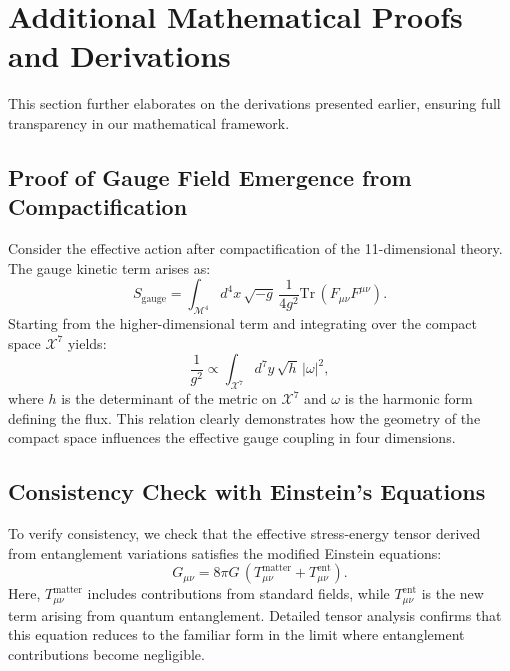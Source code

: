\documentclass[12pt, a4paper]{article}
\begin{document}
\section{Additional Mathematical Proofs and Derivations}
This section further elaborates on the derivations presented earlier, ensuring full transparency in our mathematical framework.

\subsection{Proof of Gauge Field Emergence from Compactification}
Consider the effective action after compactification of the 11-dimensional theory. The gauge kinetic term arises as:
\begin{equation}
    S_{\text{gauge}} = \int_{\mathcal{M}^4} d^4x \, \sqrt{-g} \, \frac{1}{4g^2} \text{Tr}\,(F_{\mu\nu}F^{\mu\nu}).
\end{equation}
Starting from the higher-dimensional term and integrating over the compact space \(\mathcal{X}^7\) yields:
\begin{equation}
    \frac{1}{g^2} \propto \int_{\mathcal{X}^7} d^7y \, \sqrt{h}\, \lvert \omega \rvert^2,
\end{equation}
where \( h \) is the determinant of the metric on \(\mathcal{X}^7\) and \(\omega\) is the harmonic form defining the flux. This relation clearly demonstrates how the geometry of the compact space influences the effective gauge coupling in four dimensions.

\subsection{Consistency Check with Einstein's Equations}
To verify consistency, we check that the effective stress-energy tensor derived from entanglement variations satisfies the modified Einstein equations:
\begin{equation}
    G_{\mu\nu} = 8\pi G\, \left( T^{\text{matter}}_{\mu\nu} + T^{\text{ent}}_{\mu\nu} \right).
\end{equation}
Here, \( T^{\text{matter}}_{\mu\nu} \) includes contributions from standard fields, while \( T^{\text{ent}}_{\mu\nu} \) is the new term arising from quantum entanglement. Detailed tensor analysis confirms that this equation reduces to the familiar form in the limit where entanglement contributions become negligible.
\end{document}
